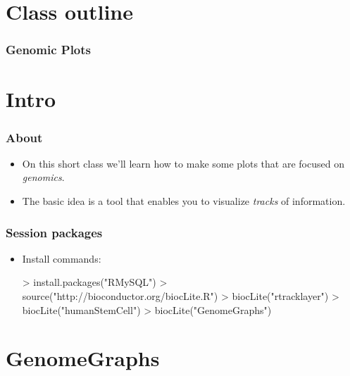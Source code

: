 




\usepackage{Sweave}


\begin{frame}[allowframebreaks]
  \titlepage
\end{frame}

\section*{Class outline}

\begin{frame}[allowframebreaks]
  \frametitle{Genomic Plots}
  \tableofcontents[hideallsubsections]
\end{frame}

\section{Intro}

\begin{frame}[allowframebreaks]
  \frametitle{About}
  \begin{itemize}
  \item On this short class we'll learn how to make some plots that are focused on \emph{genomics}.
  \item The basic idea is a tool that enables you to visualize \emph{tracks} of information.
  \end{itemize}
\end{frame}

\begin{frame}
  \frametitle{Session packages}
  \begin{itemize}
  \item Install commands:
\begin{Schunk}
\begin{Sinput}
> install.packages("RMySQL")
> source("http://bioconductor.org/biocLite.R")
> biocLite("rtracklayer")
> biocLite("humanStemCell")
> biocLite("GenomeGraphs")
\end{Sinput}
\end{Schunk}
  \end{itemize}
\end{frame}

\section{GenomeGraphs}

